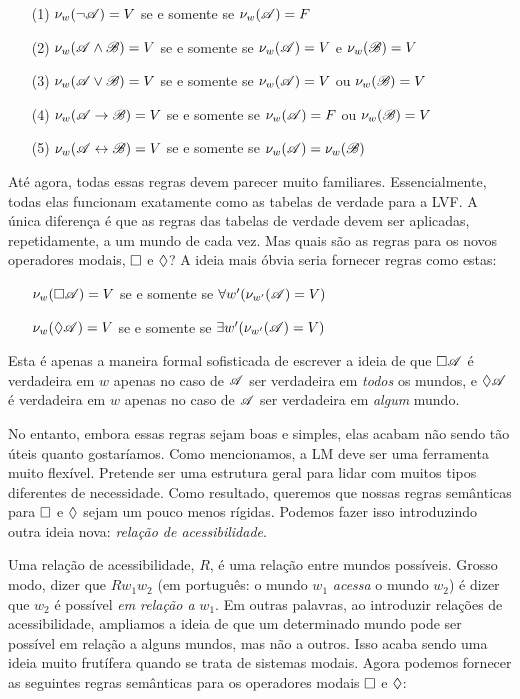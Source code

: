\begin{itemize}
	\item[(1)]$\nu_w(\neg\mathscr{A})=V$ se e somente se $\nu_w(\mathscr{A})=F$
	\item[(2)]$\nu_w(\mathscr{A}\wedge\mathscr{B})=V$ se e somente se $\nu_w(\mathscr{A})=V$ e $\nu_w(\mathscr{B})=V$
	\item[(3)]$\nu_w(\mathscr{A}\vee\mathscr{B})=V$ se e somente se $\nu_w(\mathscr{A})=V$ ou $\nu_w(\mathscr{B})=V$
	\item[(4)]$\nu_w(\mathscr{A}\rightarrow\mathscr{B})=V$ se e somente se $\nu_w(\mathscr{A})=F$ ou $\nu_w(\mathscr{B})=V$
	\item[(5)]$\nu_w(\mathscr{A}\leftrightarrow\mathscr{B})=V$ se e somente se $\nu_w(\mathscr{A})=\nu_w(\mathscr{B})$  
\end{itemize}
 

Até agora, todas essas regras devem parecer muito familiares. Essencialmente, todas elas funcionam exatamente como as tabelas de verdade para a LVF. A única diferença é que as regras das tabelas de verdade devem ser aplicadas, repetidamente, a um mundo de cada vez.
Mas quais são as regras para os novos operadores modais, $\Box$ e $\Diamond$? A ideia mais óbvia seria fornecer regras como estas:
\begin{itemize}
	\item[]$\nu_w(\Box \mathscr{A})=V$ se e somente se $\forall w' (\nu_{w'}(\mathscr{A})=V)$
	\item[]$\nu_w(\Diamond \mathscr{A})=V $ se e somente se $\exists w' (\nu_{w'}(\mathscr{A})=V)$
\end{itemize}
Esta é apenas a maneira formal sofisticada de escrever a ideia de que $\Box\mathscr{A}$ é verdadeira em $w$ apenas no caso de $\mathscr{A}$ ser verdadeira em \emph{todos} os mundos, e $\Diamond\mathscr{A}$ é verdadeira em $w$ apenas no caso de $\mathscr{A}$ ser verdadeira em \emph{algum} mundo.

No entanto, embora essas regras sejam boas e simples, elas acabam não sendo tão úteis quanto gostaríamos. Como mencionamos, a LM deve ser uma ferramenta muito flexível. Pretende ser uma estrutura geral para lidar com muitos tipos diferentes de necessidade. Como resultado, queremos que nossas regras semânticas para  $\Box$ e $\Diamond$ sejam um pouco menos rígidas. Podemos fazer isso introduzindo outra ideia nova: \emph{relação de acessibilidade}.

Uma relação de acessibilidade, $R$, é uma relação entre mundos possíveis. Grosso modo, dizer que $Rw_1w_2$ (em português: o mundo $w_1$ \emph{acessa} o mundo $w_2$) é dizer que $w_2$ é possível  \emph{em relação a} $w_1$. Em outras palavras, ao introduzir relações de acessibilidade, ampliamos a ideia de que um determinado mundo pode ser possível em relação a alguns mundos, mas não a outros. Isso acaba sendo uma ideia muito frutífera quando se trata de sistemas modais. Agora podemos fornecer as seguintes regras semânticas para os operadores modais $\Box$ e $\Diamond$:


